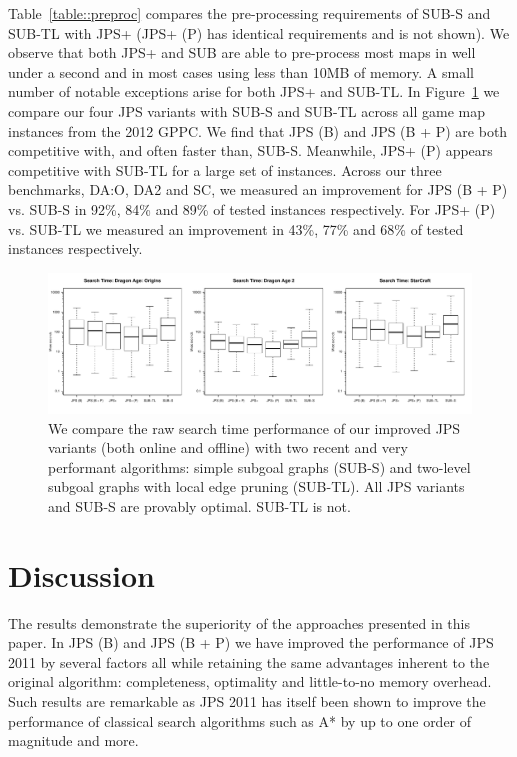 Table~\ref{table::preproc} compares the pre-processing requirements of 
SUB-S and SUB-TL with JPS+ (JPS+ (P) has identical requirements and is not shown). 
We observe that both JPS+ and SUB are able to pre-process most maps in well under a second 
and in most cases using less than 10MB of memory. A small number of notable exceptions 
arise for both JPS+ and SUB-TL.
In Figure~\ref{fig::vs_sub} we compare our four JPS variants with SUB-S and SUB-TL across all
game map instances from the 2012 GPPC. We find that JPS (B) and JPS (B + P) are both
competitive with, and often faster than, SUB-S. Meanwhile, JPS+ (P) appears competitive 
with SUB-TL for a large set of instances.
Across our three benchmarks, DA:O, DA2 and SC, we measured an improvement for 
JPS (B + P) vs. SUB-S in 92\%, 84\% and 89\% of tested instances respectively.
For JPS+ (P) vs. SUB-TL we measured an improvement in 43\%, 77\% and 68\% of 
tested instances respectively.

\begin{figure}[tb] 
\begin{center}
		   \includegraphics[width=2.15\columnwidth, trim = 0mm 0mm 0mm 0mm]
			{diagrams/jps_vs_sub_boxplot.pdf}
       \end{center}
		\vspace{-1em}
	   \caption{\small We compare the raw search time performance of our improved JPS variants (both online
		   and offline) with two recent and very performant algorithms: simple subgoal graphs (SUB-S) 
		   and two-level subgoal graphs with local edge pruning (SUB-TL). All JPS variants and SUB-S 
		   are provably optimal. SUB-TL is not.}
\label{fig::vs_sub}
\end{figure}

\section{Discussion}
The results demonstrate the superiority of the approaches presented in this
paper. In JPS (B) and JPS (B + P) we have improved the performance of
JPS 2011 by several factors all while retaining
the same advantages inherent to the original algorithm: completeness, 
optimality and little-to-no memory overhead. Such results are remarkable as
JPS 2011 has itself been shown to improve the performance of classical
search algorithms such as A* by up to one order of magnitude and more.

